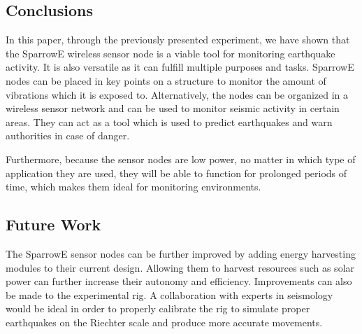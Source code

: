 \subsection{Conclusions}

In this paper, through the previously presented experiment, we have shown 
that the SparrowE wireless sensor node is a viable tool for monitoring 
earthquake activity. It is also versatile as it can fulfill multiple purposes 
and tasks. SparrowE nodes can be placed in key points on a structure to monitor 
the amount of vibrations which it is exposed to. Alternatively, the nodes can 
be organized in a wireless sensor network and can be used to monitor seismic activity 
in certain areas. They can act as a tool which is used to predict earthquakes and 
warn authorities in case of danger.

Furthermore, because the sensor nodes are low power, no matter in which type of application they 
are used, they will be able to function for prolonged periods of time, which makes them ideal 
for monitoring environments.

\subsection{Future Work}
The SparrowE sensor nodes can be further improved by adding energy harvesting modules to their 
current design. Allowing them to harvest resources such as solar power can further increase 
their autonomy and efficiency. Improvements can also be made to the experimental rig. A collaboration 
with experts in seismology would be ideal in order to properly calibrate the rig to simulate 
proper earthquakes on the Riechter scale and produce more accurate movements.

